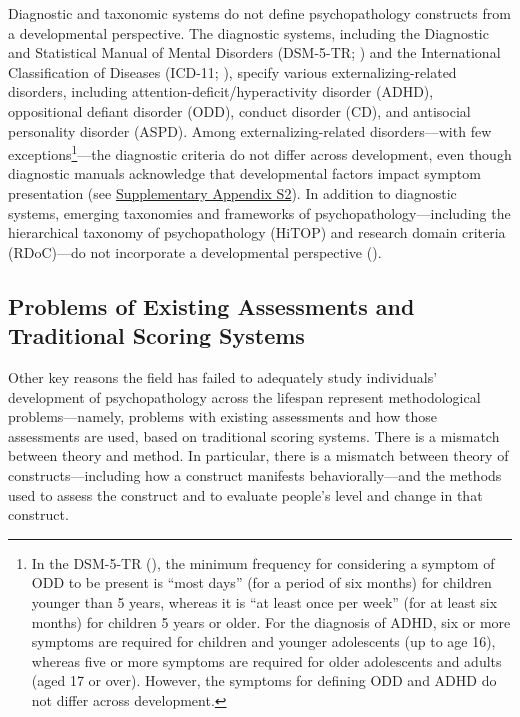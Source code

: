 \documentclass[
  american,
  letterpaper,
  12pt]{article}
\begin{document}
Diagnostic and taxonomic systems do not define psychopathology
constructs from a developmental perspective. The diagnostic systems,
including the Diagnostic and Statistical Manual of Mental Disorders
(DSM-5-TR; ) and the International Classification of Diseases (ICD-11;
), specify
various externalizing-related disorders, including
attention-deficit/hyperactivity disorder (ADHD), oppositional defiant
disorder (ODD), conduct disorder (CD), and antisocial personality
disorder (ASPD). Among externalizing-related disorders---with few
exceptions\footnote{In the DSM-5-TR (), the minimum frequency for considering
  a symptom of ODD to be present is ``most days'' (for a period of six
  months) for children younger than 5 years, whereas it is ``at least
  once per week'' (for at least six months) for children 5 years or
  older. For the diagnosis of ADHD, six or more symptoms are required
  for children and younger adolescents (up to age 16), whereas five or
  more symptoms are required for older adolescents and adults (aged 17
  or over). However, the symptoms for defining ODD and ADHD do not
  differ across development.}---the diagnostic criteria do not differ
across development, even though diagnostic manuals acknowledge that
developmental factors impact symptom presentation (see
\href{notebooks/supplement.qmd\#sec-dsmDevelopmentalFactors}{Supplementary
Appendix S2}). In addition to diagnostic systems, emerging taxonomies
and frameworks of psychopathology---including the hierarchical taxonomy
of psychopathology (HiTOP) and research domain criteria (RDoC)---do not
incorporate a developmental perspective
().

\subsection{Problems of Existing Assessments and Traditional Scoring
Systems}\label{problems-of-existing-assessments-and-traditional-scoring-systems}

Other key reasons the field has failed to adequately study individuals'
development of psychopathology across the lifespan represent
methodological problems---namely, problems with existing assessments and
how those assessments are used, based on traditional scoring systems.
There is a mismatch between theory and method. In particular, there is a
mismatch between theory of constructs---including how a construct
manifests behaviorally---and the methods used to assess the construct
and to evaluate people's level and change in that construct.
\end{document}
